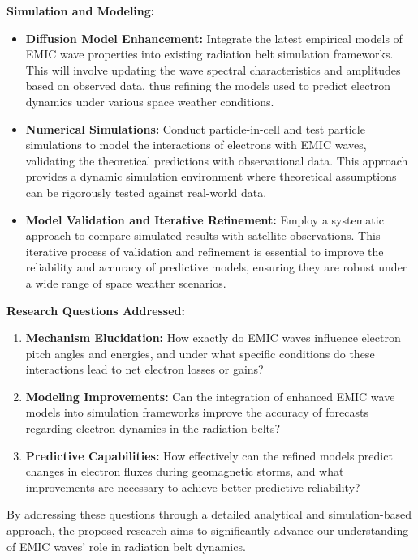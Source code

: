\documentclass[
  letterpaper,
  DIV=11,
  numbers=noendperiod]{scrartcl}
\providecommand{\tightlist}{%
  \setlength{\itemsep}{0pt}\setlength{\parskip}{0pt}}\usepackage{longtable,booktabs,array}
\begin{document}
\textbf{Simulation and Modeling:}

\begin{itemize}
\item
  \textbf{Diffusion Model Enhancement:} Integrate the latest empirical models of EMIC wave properties into existing radiation belt simulation frameworks. This will involve updating the wave spectral characteristics and amplitudes based on observed data, thus refining the models used to predict electron dynamics under various space weather conditions.
\item
  \textbf{Numerical Simulations:} Conduct particle-in-cell and test particle simulations to model the interactions of electrons with EMIC waves, validating the theoretical predictions with observational data. This approach provides a dynamic simulation environment where theoretical assumptions can be rigorously tested against real-world data.
\item
  \textbf{Model Validation and Iterative Refinement:} Employ a systematic approach to compare simulated results with satellite observations. This iterative process of validation and refinement is essential to improve the reliability and accuracy of predictive models, ensuring they are robust under a wide range of space weather scenarios.
\end{itemize}

\textbf{Research Questions Addressed:}

\begin{enumerate}
\def\labelenumi{\arabic{enumi}.}
\tightlist
\item
  \textbf{Mechanism Elucidation:} How exactly do EMIC waves influence electron pitch angles and energies, and under what specific conditions do these interactions lead to net electron losses or gains?
\item
  \textbf{Modeling Improvements:} Can the integration of enhanced EMIC wave models into simulation frameworks improve the accuracy of forecasts regarding electron dynamics in the radiation belts?
\item
  \textbf{Predictive Capabilities:} How effectively can the refined models predict changes in electron fluxes during geomagnetic storms, and what improvements are necessary to achieve better predictive reliability?
\end{enumerate}

By addressing these questions through a detailed analytical and simulation-based approach, the proposed research aims to significantly advance our understanding of EMIC waves' role in radiation belt dynamics.
\end{document}
